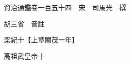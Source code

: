 










 


 
 


 

  
  
  
  
  





  
  
  
  
  
 
  

  

  
  
  



  

 
 

  
   




  

  
  


  　　資治通鑑卷一百五十四　宋　司馬光　撰

　　胡三省　音註

　　梁紀十【上章閹茂一年】

　　高祖武皇帝十

